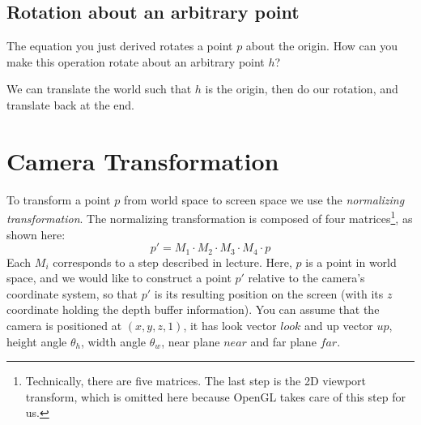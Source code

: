 \documentclass[10pt,twocolumn]{article}
\begin{document}
\subsection{Rotation about an arbitrary point}
\begin{framed}
\noindent{\bf [1 point]} The equation you just derived rotates a point $p$ about the origin. How can you make this operation rotate about an arbitrary point $h$?
\end{framed}

\begin{framed}
We can translate the world such that $h$ is the origin, then do our rotation, and translate back at the end.
\end{framed}


\section{Camera Transformation}
To transform a point $p$ from world space to screen space we use the \emph{normalizing transformation}. The normalizing transformation is composed of four matrices\footnote{Technically, there are five matrices. The last step is the 2D viewport transform, which is omitted here because OpenGL takes care of this step for us.}, as shown here:
\[p' = M_1 \cdot M_2 \cdot M_3 \cdot M_4 \cdot p\]
Each $M_i$ corresponds to a step described in lecture. Here, $p$ is a point in world space, and we would like to construct a point $p'$ relative to the camera's coordinate system, so that $p'$ is its resulting position on the screen (with its $z$ coordinate holding the depth buffer information). You can assume that the camera is positioned at $(x,y,z,1)$, it has look vector $look$ and up vector $up$, height angle $\theta_h$, width angle $\theta_w$, near plane $near$ and far plane $far$.
\end{document}
